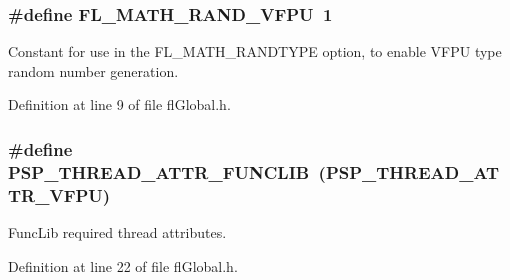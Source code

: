 \subsubsection{\setlength{\rightskip}{0pt plus 5cm}\#define FL\_\-MATH\_\-RAND\_\-VFPU~1}\label{flGlobal_8h_349974e335656e1d3bb33d0abad26bdc}


Constant for use in the FL\_\-MATH\_\-RANDTYPE option, to enable VFPU type random number generation. 



Definition at line 9 of file fl\-Global.h.
\subsubsection{\setlength{\rightskip}{0pt plus 5cm}\#define PSP\_\-THREAD\_\-ATTR\_\-FUNCLIB~(PSP\_\-THREAD\_\-ATTR\_\-VFPU)}\label{flGlobal_8h_eace11b657670a3bffa5f5bfb726ef23}


Func\-Lib required thread attributes. 



Definition at line 22 of file fl\-Global.h.